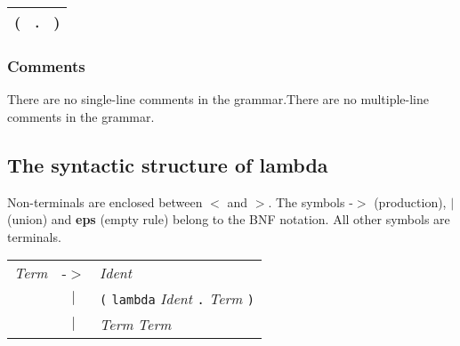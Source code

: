 \documentclass{article}
\begin{document}
\begin{center}\begin{tabular}{|l|l|l|}
\hline ( & . & ) \\
\hline \end{tabular}\end{center}

\subsubsection*{Comments}

There are no single-line comments in the grammar.There are no multiple-line comments in the grammar.

\subsection*{The syntactic structure of lambda}

Non-terminals are enclosed between $<$ and $>$.
The symbols -$>$ (production),  \textbf{$|$}  (union)
and \textbf{eps} (empty rule) belong to the BNF notation.
All other symbols are terminals.

\begin{center}\begin{tabular}{lll}
\textit{Term} & -$>$ & \textit{Ident} \\
 & \multicolumn{1}{c}{\textbf{$|$}} & \texttt{(} \texttt{lambda} \textit{Ident} \texttt{.} \textit{Term} \texttt{)} \\
 & \multicolumn{1}{c}{\textbf{$|$}} & \textit{Term} \textit{Term} \\
\end{tabular}\end{center}

\end{document}

